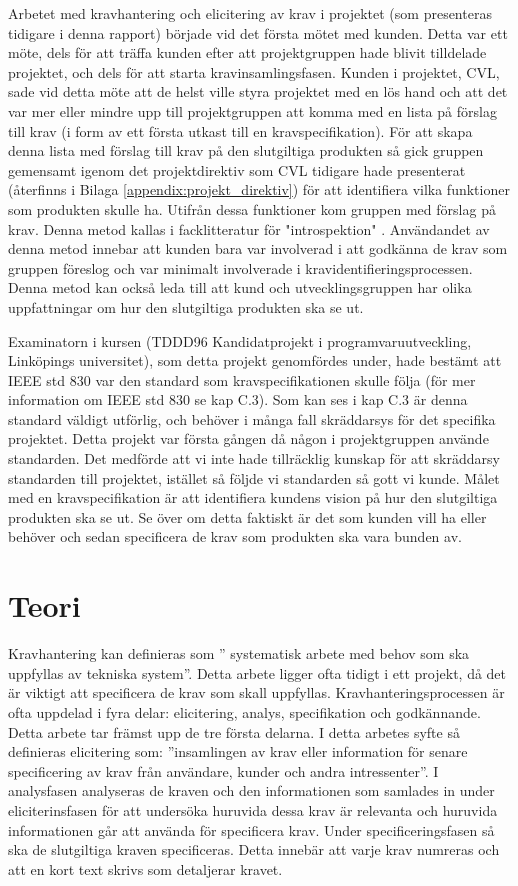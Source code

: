 Arbetet med kravhantering och elicitering av krav i projektet (som presenteras tidigare i denna rapport) började vid det första mötet med kunden. Detta var ett möte, dels för att träffa kunden efter att projektgruppen hade blivit tilldelade projektet, och dels för att starta kravinsamlingsfasen. Kunden i projektet, CVL, sade vid detta möte att de helst ville styra projektet med en lös hand och att det var mer eller mindre upp till projektgruppen att komma med en lista på förslag till krav (i form av ett första utkast till en kravspecifikation). För att skapa denna lista med förslag till krav på den slutgiltiga produkten så gick gruppen gemensamt igenom det projektdirektiv som CVL tidigare hade presenterat (återfinns i Bilaga \ref{appendix:projekt_direktiv}) för att identifiera vilka funktioner som produkten skulle ha. Utifrån dessa funktioner kom gruppen med förslag på krav. Denna metod kallas i facklitteratur för "introspektion" \cite{goguen1993techniques}. Användandet av denna metod innebar att kunden bara var involverad i att godkänna de krav som gruppen föreslog och var minimalt involverade i kravidentifieringsprocessen. Denna metod kan också leda till att kund och utvecklingsgruppen har olika uppfattningar om hur den slutgiltiga produkten ska se ut. 

Examinatorn i kursen (TDDD96 Kandidatprojekt i programvaruutveckling, Linköpings universitet), som detta projekt genomfördes under, hade bestämt att IEEE std 830 var den standard som kravspecifikationen skulle följa (för mer information om IEEE std 830 se kap C.3). Som kan ses i kap C.3 är denna standard väldigt utförlig, och behöver i många fall skräddarsys för det specifika projektet. Detta projekt var första gången då någon i projektgruppen använde standarden. Det medförde att vi inte hade tillräcklig kunskap för att skräddarsy standarden till projektet, istället så följde vi standarden så gott vi kunde. Målet med en kravspecifikation är att identifiera kundens vision på hur den slutgiltiga produkten ska se ut. Se över om detta faktiskt är det som kunden vill ha eller behöver och sedan specificera de krav som produkten ska vara bunden av. 


\section{Teori}
\label{sec:theory-jannering}
Kravhantering kan definieras som ” systematisk arbete med behov som ska uppfyllas av tekniska system”. Detta arbete ligger ofta tidigt i ett projekt, då det är viktigt att specificera de krav som skall uppfyllas. Kravhanteringsprocessen är ofta uppdelad i fyra delar: elicitering, analys, specifikation och godkännande. Detta arbete tar främst upp de tre första delarna. I detta arbetes syfte så definieras elicitering som: ”insamlingen av krav eller information för senare specificering av krav från användare, kunder och andra intressenter”. I analysfasen analyseras de kraven och den informationen som samlades in under eliciterinsfasen för att undersöka huruvida dessa krav är relevanta och huruvida informationen går att använda för specificera krav. Under specificeringsfasen så ska de slutgiltiga kraven specificeras. Detta innebär att varje krav numreras och att en kort text skrivs som detaljerar kravet.
